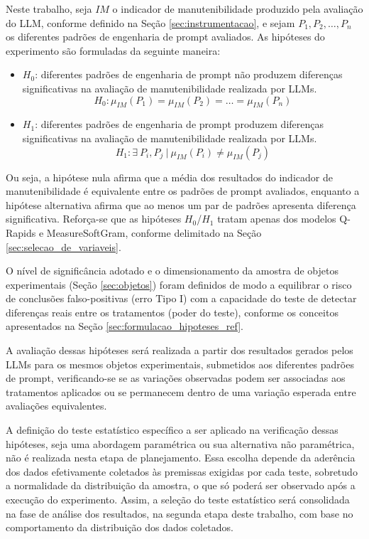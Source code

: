 Neste trabalho, seja $IM$ o indicador de manutenibilidade produzido pela avaliação do LLM, conforme definido na Seção \ref{sec:instrumentacao}, e sejam $P_1, P_2, \ldots, P_n$ os diferentes padrões de engenharia de prompt avaliados. As hipóteses do experimento são formuladas da seguinte maneira:

\begin{itemize}
    \item[] $H_0$: diferentes padrões de engenharia de prompt não produzem
    diferenças significativas na avaliação de manutenibilidade realizada
    por LLMs.
    $$H_0 : \mu_{IM}(P_1) = \mu_{IM}(P_2) = \ldots = \mu_{IM}(P_n)$$

    \item[] $H_1$: diferentes padrões de engenharia de prompt produzem
    diferenças significativas na avaliação de manutenibilidade realizada
    por LLMs.
    $$H_1 : \exists\ P_i, P_j\ |\ \mu_{IM}(P_i) \neq \mu_{IM}(P_j)$$
\end{itemize}

Ou seja, a hipótese nula afirma que a média dos resultados do indicador de manutenibilidade é equivalente entre os padrões de prompt avaliados, enquanto a hipótese alternativa afirma que ao menos um par de padrões apresenta diferença significativa. Reforça-se que as hipóteses $H_0$/$H_1$ tratam apenas dos modelos Q-Rapids e MeasureSoftGram, conforme delimitado na Seção \ref{sec:selecao_de_variaveis}.

O nível de significância adotado e o dimensionamento da amostra de objetos experimentais (Seção \ref{sec:objetos}) foram definidos de modo a equilibrar o risco de conclusões falso-positivas (erro Tipo I) com a capacidade do teste de detectar diferenças reais entre os tratamentos (poder do teste), conforme os conceitos apresentados na Seção \ref{sec:formulacao_hipoteses_ref}.

A avaliação dessas hipóteses será realizada a partir dos resultados gerados pelos LLMs para os mesmos objetos experimentais, submetidos aos diferentes padrões de prompt, verificando-se se as variações observadas podem ser associadas aos tratamentos aplicados ou se permanecem dentro de uma variação esperada entre avaliações equivalentes.

A definição do teste estatístico específico a ser aplicado na verificação dessas hipóteses, seja uma abordagem paramétrica ou sua alternativa não paramétrica, não é realizada nesta etapa de planejamento. Essa escolha depende da aderência dos dados efetivamente coletados às premissas exigidas por cada teste, sobretudo a normalidade da distribuição da amostra, o que só poderá ser observado após a execução do experimento. Assim, a seleção do teste estatístico será consolidada na fase de análise dos resultados, na segunda etapa deste trabalho, com base no comportamento da distribuição dos dados coletados.

